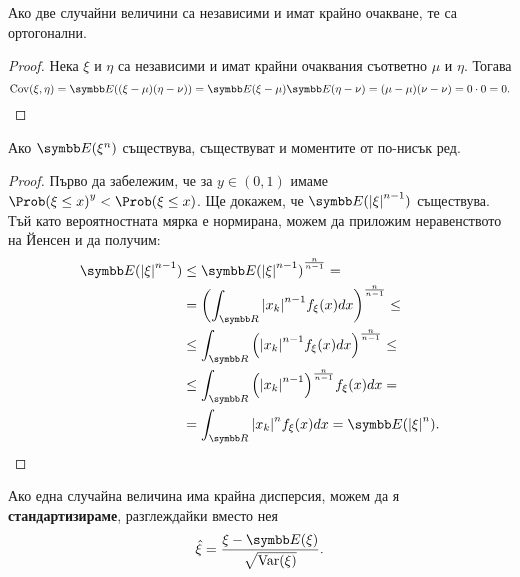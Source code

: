 \documentclass[
  headings=standardclasses,
  bibliography=totocnumbered,
]{scrartcl}
\begin{document}
\begin{proposition}\label{thm:independence_implies_orthogonality}
  Ако две случайни величини са независими и имат крайно очакване, те са ортогонални.
\end{proposition}
\begin{proof}
  Нека \( \xi \) и \( \eta \) са независими и имат крайни очаквания съответно \( \mu \) и \( \eta \). Тогава
  \begin{equation*}
    \Cov(\xi, \eta)
    =
    \Expect((\xi - \mu) (\eta - \nu))
    =
    \Expect(\xi - \mu) \Expect(\eta - \nu)
    =
    (\mu - \mu) (\nu - \nu)
    =
    0 \cdot 0
    =
    0.
  \end{equation*}
\end{proof}

\begin{proposition}\label{thm:lower_order_moments_exist}
  Ако \( \Expect(\xi^n) \) съществува, съществуват и моментите от по-нисък ред.
\end{proposition}
\begin{proof}
  Първо да забележим, че за \( y \in (0, 1) \) имаме \( {\Prob(\xi \leq x)}^y < \Prob(\xi \leq x) \). Ще докажем, че \( \Expect({\Abs{\xi}}^{n-1}) \) съществува. Тъй като вероятностната мярка е нормирана, можем да приложим неравенството на Йенсен и да получим:
  \begin{align*}
    \Expect({\Abs{\xi}}^{n-1})
    &\leq
    {\Expect({\Abs{\xi}}^{n-1})}^{\frac n {n-1}}
    = \\ &=
    {\left( \int_{\R} {\Abs{x_k}}^{n-1} f_\xi(x) dx \right)}^{\frac n {n-1}}
    \leq \\ &\leq
    \int_{\R} {\left({\Abs{x_k}}^{n-1} f_\xi(x) dx \right)}^{\frac n {n-1}}
    \leq \\ &\leq
    \int_{\R} {\left({\Abs{x_k}}^{n-1} \right)}^{\frac n {n-1}} f_\xi(x) dx
    = \\ &=
    \int_{\R} {\Abs{x_k}}^n f_\xi(x) dx
    =
    \Expect({\Abs{\xi}}^n).
  \end{align*}
\end{proof}

\begin{definition}
  Ако една случайна величина има крайна дисперсия, можем да я \textbf{стандартизираме}, разглеждайки вместо нея
  \begin{equation*}
    \hat \xi = \frac {\xi - \Expect(\xi)} {\sqrt{\Var(\xi)}}.
  \end{equation*}
\end{definition}
\end{document}
